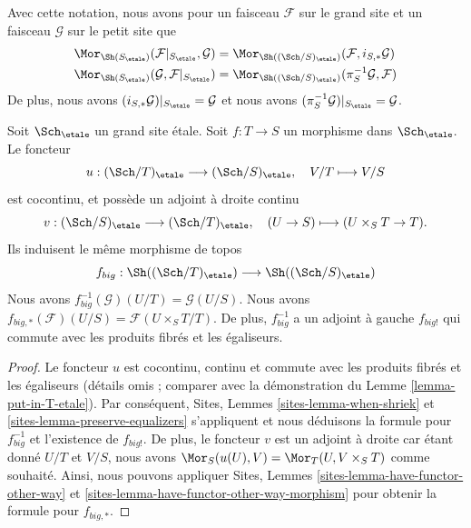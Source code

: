 \noindent
Avec cette notation, nous avons pour un faisceau $\mathcal{F}$ sur le grand site et un faisceau $\mathcal{G}$ sur le petit site que
\begin{align*}
\Mor_{\Sh(S_\etale)}(
\mathcal{F}|_{S_\etale},
\mathcal{G})
& =
\Mor_{\Sh((\Sch/S)_\etale)}(
\mathcal{F},
i_{S, *}\mathcal{G}) \\
\Mor_{\Sh(S_\etale)}(
\mathcal{G},
\mathcal{F}|_{S_\etale})
& =
\Mor_{\Sh((\Sch/S)_\etale)}(
\pi_S^{-1}\mathcal{G},
\mathcal{F})
\end{align*}
De plus, nous avons $(i_{S, *}\mathcal{G})|_{S_\etale} = \mathcal{G}$ et nous avons $(\pi_S^{-1}\mathcal{G})|_{S_\etale} = \mathcal{G}$.

\begin{lemma}
\label{lemma-morphism-big-etale}
Soit $\Sch_\etale$ un grand site étale. Soit $f : T \to S$ un morphisme dans $\Sch_\etale$. Le foncteur
$$
u :
(\Sch/T)_\etale
\longrightarrow
(\Sch/S)_\etale,
\quad
V/T \longmapsto V/S
$$
est cocontinu, et possède un adjoint à droite continu
$$
v :
(\Sch/S)_\etale
\longrightarrow
(\Sch/T)_\etale,
\quad
(U \to S) \longmapsto (U \times_S T \to T).
$$
Ils induisent le même morphisme de topos
$$
f_{big} :
\Sh((\Sch/T)_\etale)
\longrightarrow
\Sh((\Sch/S)_\etale)
$$
Nous avons $f_{big}^{-1}(\mathcal{G})(U/T) = \mathcal{G}(U/S)$. Nous avons $f_{big, *}(\mathcal{F})(U/S) = \mathcal{F}(U \times_S T/T)$. De plus, $f_{big}^{-1}$ a un adjoint à gauche $f_{big!}$ qui commute avec les produits fibrés et les égaliseurs.
\end{lemma}

\begin{proof}
Le foncteur $u$ est cocontinu, continu et commute avec les produits fibrés et les égaliseurs (détails omis ; comparer avec la démonstration du Lemme \ref{lemma-put-in-T-etale}). Par conséquent, Sites, Lemmes \ref{sites-lemma-when-shriek} et \ref{sites-lemma-preserve-equalizers} s'appliquent et nous déduisons la formule pour $f_{big}^{-1}$ et l'existence de $f_{big!}$. De plus, le foncteur $v$ est un adjoint à droite car étant donné $U/T$ et $V/S$, nous avons $\Mor_S(u(U), V) = \Mor_T(U, V \times_S T)$ comme souhaité. Ainsi, nous pouvons appliquer Sites, Lemmes \ref{sites-lemma-have-functor-other-way} et \ref{sites-lemma-have-functor-other-way-morphism} pour obtenir la formule pour $f_{big, *}$.
\end{proof}


